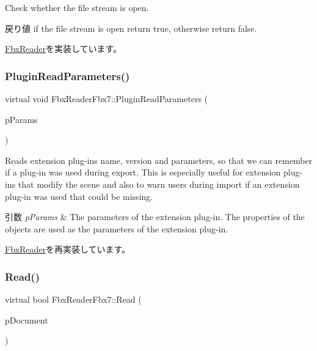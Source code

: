 Check whether the file stream is open. \begin{DoxyReturn}{戻り値}
if the file stream is open return {\ttfamily true}, otherwise return {\ttfamily false}. 
\end{DoxyReturn}


\hyperlink{class_fbx_reader_af86b437702ffc840cfab52185cbc7232}{Fbx\+Reader}を実装しています。

\mbox{\label{class_fbx_reader_fbx7_a60ceb6537da84cfd6540adde212b7b8f}} 
\subsubsection{\texorpdfstring{Plugin\+Read\+Parameters()}{PluginReadParameters()}}
{\footnotesize\ttfamily virtual void Fbx\+Reader\+Fbx7\+::\+Plugin\+Read\+Parameters (\begin{DoxyParamCaption}\item[{\hyperlink{class_fbx_object}{Fbx\+Object} \&}]{p\+Params }\end{DoxyParamCaption})\hspace{0.3cm}{\ttfamily [virtual]}}

Reads extension plug-\/ins name, version and parameters, so that we can remember if a plug-\/in was used during export. This is especially useful for extension plug-\/ins that modify the scene and also to warn users during import if an extension plug-\/in was used that could be missing. 
\begin{DoxyParams}{引数}
{\em p\+Params} & The parameters of the extension plug-\/in. The properties of the objects are used as the parameters of the extension plug-\/in. \\
\hline
\end{DoxyParams}


\hyperlink{class_fbx_reader_aa026634b699bea0df1b43850c08bb63a}{Fbx\+Reader}を再実装しています。

\mbox{\label{class_fbx_reader_fbx7_a037c53dbae903fd4aafbb942a563f759}} 
\subsubsection{\texorpdfstring{Read()}{Read()}\hspace{0.1cm}{\footnotesize\ttfamily [1/2]}}
{\footnotesize\ttfamily virtual bool Fbx\+Reader\+Fbx7\+::\+Read (\begin{DoxyParamCaption}\item[{\hyperlink{class_fbx_document}{Fbx\+Document} $\ast$}]{p\+Document }\end{DoxyParamCaption})\hspace{0.3cm}{\ttfamily [virtual]}}

